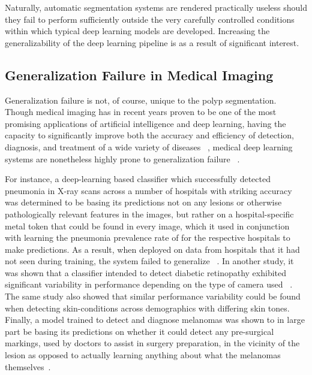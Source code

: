 	Naturally, automatic segmentation systems are rendered practically useless should they fail to perform sufficiently outside the very carefully controlled conditions within which typical deep learning models are developed. Increasing the generalizability of the deep learning pipeline is as a result of significant interest. 
	
	\subsection{Generalization Failure in Medical Imaging}
	Generalization failure is not, of course, unique to the polyp segmentation. Though medical imaging has in recent years proven to be one of the most promising applications of artificial intelligence and deep learning, having the capacity to significantly improve both the accuracy and efficiency of detection, diagnosis, and treatment of a wide variety of diseases ~\cite{dl_medical_imaging}, medical deep learning systems are nonetheless highly prone to generalization failure ~\cite{damour2020underspecification, shortcut_learning}.
	
	For instance, a deep-learning based classifier which successfully detected pneumonia in X-ray scans across a number of hospitals with striking accuracy was determined to be basing its predictions not on any lesions or otherwise pathologically relevant features in the images, but rather on a hospital-specific metal token that could be found in every image, which it used in conjunction with learning the pneumonia prevalence rate of for the respective hospitals to make predictions. As a result, when deployed on data from hospitals that it had not seen during training, the system failed to generalize ~\cite{pneumonia}. In another study, it was shown that a classifier intended to detect diabetic retinopathy exhibited significant variability in performance depending on the type of camera used ~\cite{damour2020underspecification}. The same study also showed that similar performance variability could be found when detecting skin-conditions across demographics with differing skin tones. Finally, a model trained to detect and diagnose melanomas  was shown to in large part be basing its predictions on whether it could detect any pre-surgical markings, used by doctors to assist in surgery preparation, in the vicinity of the lesion as opposed to actually learning anything about what the melanomas themselves~\cite{skin_shortcut}.  
	 
